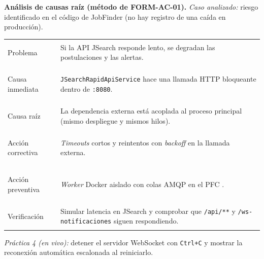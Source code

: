 \documentclass[11pt,a4paper]{article}
\begin{document}
\textbf{Análisis de causas raíz (método de FORM-AC-01).} \textit{Caso analizado:}
riesgo identificado en el código de JobFinder (no hay registro de una caída en
producción).
\begin{center}
\small
\begin{tabularx}{\linewidth}{>{\bfseries\raggedright\arraybackslash}p{3.1cm}
                             >{\raggedright\arraybackslash}X}
\toprule
Problema & Si la API JSearch responde lento, se degradan las postulaciones y las alertas.\\
Causa inmediata & \texttt{JSearchRapidApiService} hace una llamada HTTP bloqueante dentro de \texttt{:8080}.\\
Causa raíz & La dependencia externa está acoplada al proceso principal (mismo despliegue y mismos hilos).\\
Acción correctiva & \textit{Timeouts} cortos y reintentos con \textit{backoff} en la llamada externa.\\
Acción preventiva & \textit{Worker} Docker aislado con colas AMQP en el PFC \cite{petrescu2025iotprotocols}.\\
Verificación & Simular latencia en JSearch y comprobar que \texttt{/api/**} y \texttt{/ws-notificaciones} siguen respondiendo.\\
\bottomrule
\end{tabularx}
\end{center}

\textit{Práctica 4 (en vivo):} detener el servidor WebSocket con \texttt{Ctrl+C} y
mostrar la reconexión automática escalonada al reiniciarlo.

\end{document}
